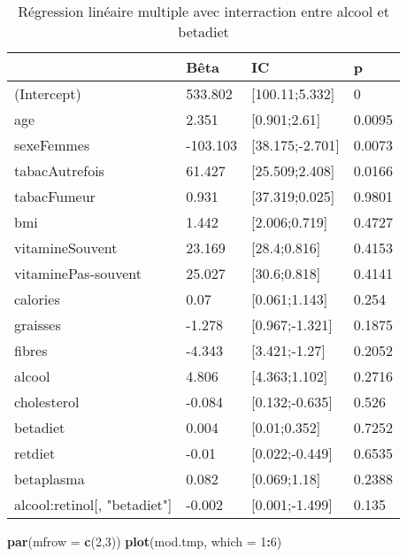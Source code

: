 \documentclass[]{article}
\newenvironment{Shaded}{\begin{snugshade}}{\end{snugshade}}
\newcommand{\KeywordTok}[1]{\textcolor[rgb]{0.13,0.29,0.53}{\textbf{#1}}}
\newcommand{\DataTypeTok}[1]{\textcolor[rgb]{0.13,0.29,0.53}{#1}}
\newcommand{\DecValTok}[1]{\textcolor[rgb]{0.00,0.00,0.81}{#1}}
\newcommand{\OperatorTok}[1]{\textcolor[rgb]{0.81,0.36,0.00}{\textbf{#1}}}
\newcommand{\NormalTok}[1]{#1}
\begin{document}
\begin{table}

\caption{\label{tab:unnamed-chunk-77}Régression linéaire multiple avec interraction entre alcool et betadiet}
\centering
\begin{tabular}[t]{l|l|l|l}
\hline
  & Bêta & IC & p\\
\hline
\rowcolor[HTML]{BBD2E1}  (Intercept) & 533.802 & [100.11;5.332] & 0\\
\hline
age & 2.351 & [0.901;2.61] & 0.0095\\
\hline
\rowcolor[HTML]{BBD2E1}  sexeFemmes & -103.103 & [38.175;-2.701] & 0.0073\\
\hline
tabacAutrefois & 61.427 & [25.509;2.408] & 0.0166\\
\hline
\rowcolor[HTML]{BBD2E1}  tabacFumeur & 0.931 & [37.319;0.025] & 0.9801\\
\hline
bmi & 1.442 & [2.006;0.719] & 0.4727\\
\hline
\rowcolor[HTML]{BBD2E1}  vitamineSouvent & 23.169 & [28.4;0.816] & 0.4153\\
\hline
vitaminePas-souvent & 25.027 & [30.6;0.818] & 0.4141\\
\hline
\rowcolor[HTML]{BBD2E1}  calories & 0.07 & [0.061;1.143] & 0.254\\
\hline
graisses & -1.278 & [0.967;-1.321] & 0.1875\\
\hline
\rowcolor[HTML]{BBD2E1}  fibres & -4.343 & [3.421;-1.27] & 0.2052\\
\hline
alcool & 4.806 & [4.363;1.102] & 0.2716\\
\hline
\rowcolor[HTML]{BBD2E1}  cholesterol & -0.084 & [0.132;-0.635] & 0.526\\
\hline
betadiet & 0.004 & [0.01;0.352] & 0.7252\\
\hline
\rowcolor[HTML]{BBD2E1}  retdiet & -0.01 & [0.022;-0.449] & 0.6535\\
\hline
betaplasma & 0.082 & [0.069;1.18] & 0.2388\\
\hline
\rowcolor[HTML]{BBD2E1}  alcool:retinol[, "betadiet"] & -0.002 & [0.001;-1.499] & 0.135\\
\hline
\end{tabular}
\end{table}

\begin{Shaded}
\begin{Highlighting}[]
\KeywordTok{par}\NormalTok{(}\DataTypeTok{mfrow =} \KeywordTok{c}\NormalTok{(}\DecValTok{2}\NormalTok{,}\DecValTok{3}\NormalTok{))}
\KeywordTok{plot}\NormalTok{(mod.tmp, }\DataTypeTok{which =} \DecValTok{1}\OperatorTok{:}\DecValTok{6}\NormalTok{)}
\end{Highlighting}
\end{Shaded}
\end{document}
